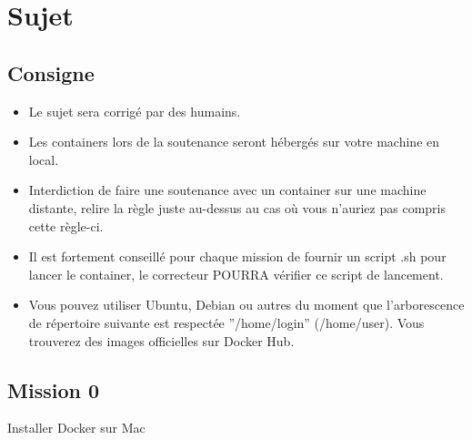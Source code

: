 \documentclass{42}
\begin{document}
	\newpage

\chapter{Sujet}

\section{Consigne}
\begin{itemize}
	\item Le sujet sera corrigé par des humains.
	\item Les containers lors de la soutenance seront hébergés sur votre machine en local.
	\item Interdiction de faire une soutenance avec un container sur une machine distante, relire la règle juste au-dessus au cas où vous n’auriez pas compris cette règle-ci.
	\item Il est fortement conseillé pour chaque mission de fournir un script .sh pour lancer le container, le correcteur POURRA vérifier ce script de lancement.
	\item Vous pouvez utiliser Ubuntu, Debian ou autres du moment que l'arborescence de répertoire suivante est respectée ''/home/login'' (/home/user). Vous trouverez des images officielles sur Docker Hub.
\end{itemize}


	\newpage

\section{Mission 0}
\begin{center}
	{\Huge Installer Docker sur Mac}
\end{center}
\end{document}
